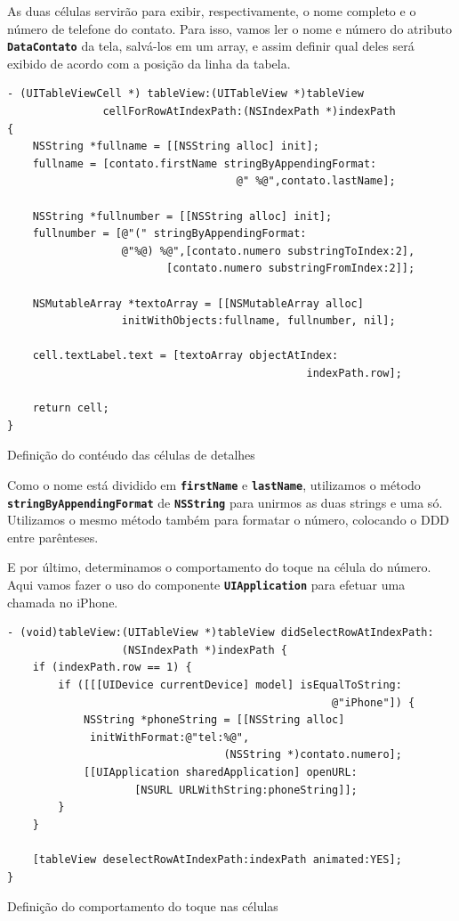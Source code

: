 \documentclass[a4paper,12pt,brazil,oneside]{book}
\begin{document}
As duas células servirão para exibir, respectivamente, o nome completo e o número de telefone do contato. Para isso, vamos ler o nome e número do atributo \texttt{\textbf{DataContato}} da tela, salvá-los em um array, e assim definir qual deles será exibido de acordo com a posição da linha da tabela.

\begin{listing}[H]
\begin{verbatim}
- (UITableViewCell *) tableView:(UITableView *)tableView
               cellForRowAtIndexPath:(NSIndexPath *)indexPath
{
    NSString *fullname = [[NSString alloc] init];
    fullname = [contato.firstName stringByAppendingFormat:
                                    @" %@",contato.lastName];
    
    NSString *fullnumber = [[NSString alloc] init];
    fullnumber = [@"(" stringByAppendingFormat:
                  @"%@) %@",[contato.numero substringToIndex:2],
                         [contato.numero substringFromIndex:2]];
    
    NSMutableArray *textoArray = [[NSMutableArray alloc]
                  initWithObjects:fullname, fullnumber, nil];

    cell.textLabel.text = [textoArray objectAtIndex:
                                               indexPath.row];
    
    return cell;
}
\end{verbatim}
\caption{Definição do contéudo das células de detalhes}
\end{listing}


Como o nome está dividido em \texttt{\textbf{firstName}} e \texttt{\textbf{lastName}}, utilizamos o método\\
\texttt{\textbf{stringByAppendingFormat}} de \texttt{\textbf{NSString}} para unirmos as duas strings e uma só. Utilizamos o mesmo método também para formatar o número, colocando o DDD entre parênteses.

E por último, determinamos o comportamento do toque na célula do número. Aqui vamos fazer o uso do componente \texttt{\textbf{UIApplication}} para efetuar uma chamada no iPhone.

\begin{listing}[H]
\begin{verbatim}
- (void)tableView:(UITableView *)tableView didSelectRowAtIndexPath:
                  (NSIndexPath *)indexPath {
    if (indexPath.row == 1) {
        if ([[[UIDevice currentDevice] model] isEqualToString:
                                                   @"iPhone"]) {
            NSString *phoneString = [[NSString alloc] 
             initWithFormat:@"tel:%@",
                                  (NSString *)contato.numero];
            [[UIApplication sharedApplication] openURL:
                    [NSURL URLWithString:phoneString]];
        }
    }
    
    [tableView deselectRowAtIndexPath:indexPath animated:YES];
}
\end{verbatim}
\caption{Definição do comportamento do toque nas células}
\end{listing}
\end{document}
